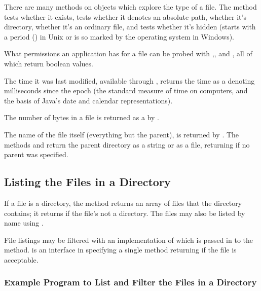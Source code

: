 There are many methods on  objects which explore the type
of a file.  The method  tests whether it exists,
 tests whether it
denotes an absolute path,  whether it's directory,
 whether it's an ordinary file, and
 tests whether it's hidden (starts with a period () in
Unix or is so marked by the operating system in Windows).

What permissions an application has for a file can be probed with
,, and , all of
which return boolean values.

The time it was last modified, available through
, returns the time as a  denoting
milliseconds since the epoch (the standard measure of time on
computers, and the basis of Java's date and calendar representations).

The number of bytes in a file is returned as a  by
.

The name of the file itself (everything but the parent), is returned
by .  The methods  and
 return the parent directory as a string or as a
file, returning  if no parent was specified.

\subsection{Listing the Files in a Directory}

If a file is a directory, the method  returns an
array of files that the directory contains; it returns 
if the file's not a directory.  The files may also be listed
by name using . 

File listings may be filtered with an implementation of
 which is passed in to the  method.
 is an interface in  specifying a single
method  returning  if the file is
acceptable.

\subsubsection{Example Program to List and Filter the Files in a Directory}


